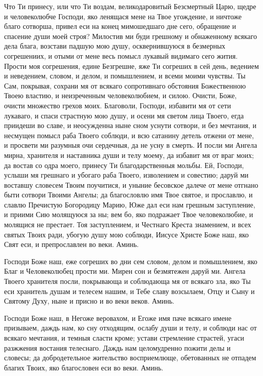 

Что Ти принесу, или что Ти воздам, великодаровитый Безсмертный Царю, щедре и человеколюбче Господи, яко ленящася мене на Твое угождение, и ничтоже благо сотворша, привел еси на конец мимошедшаго дне сего, обращение и спасение души моей строя? Милостив ми буди грешному и обнаженному всякаго дела блага, возстави падшую мою душу, осквернившуюся в безмерных согрешениих, и отыми от мене весь помысл лукавый видимаго сего жития. Прости моя согрешения, едине Безгрешне, яже Ти согреших в сей день, ведением и неведением, словом, и делом, и помышлением, и всеми моими чувствы. Ты Сам, покрывая, сохрани мя от всякаго сопротивнаго обстояния Божественною Твоею властию, и неизреченным человеколюбием, и силою. Очисти, Боже, очисти множество грехов моих. Благоволи, Господи, избавити мя от сети лукаваго, и спаси страстную мою душу, и осени мя светом лица Твоего, егда приидеши во славе, и неосужденна ныне сном уснути сотвори, и без мечтания, и несмущен помысл раба Твоего соблюди, и всю сатанину детель отжени от мене, и просвети ми разумныя очи сердечныя, да не усну в смерть. И посли ми Ангела мирна, хранителя и наставника души и телу моему, да избавит мя от враг моих; да востав со одра моего, принесу Ти благодарственныя мольбы. Ей, Господи, услыши мя грешнаго и убогаго раба Твоего, изволением и совестию; даруй ми воставшу словесем Твоим поучитися, и уныние бесовское далече от мене отгнано быти сотвори Твоими Ангелы; да благословлю имя Твое святое, и прославлю, и славлю Пречистую Богородицу Марию, Юже дал еси нам грешным заступление, и приими Сию молящуюся за ны; вем бо, яко подражает Твое человеколюбие, и молящися не престает. Тоя заступлением, и Честнаго Креста знамением, и всех святых Твоих ради, убогую душу мою соблюди, Иисусе Христе Боже наш, яко Свят еси, и препрославлен во веки. Аминь.




Господи Боже наш, еже согреших во дни сем словом, делом и помышлением, яко Благ и Человеколюбец прости ми. Мирен сон и безмятежен даруй ми. Ангела Твоего хранителя посли, покрывающа и соблюдающа мя от всякаго зла, яко Ты еси хранитель душам и телесем нашим, и Тебе славу возсылаем, Отцу и Сыну и Святому Духу, ныне и присно и во веки веков. Аминь.




Господи Боже наш, в Негоже веровахом, и Егоже имя паче всякаго имене призываем, даждь нам, ко сну отходящим, ослабу души и телу, и соблюди нас от всякаго мечтания, и темныя сласти кроме; устави стремление страстей, угаси разжжения востания телеснаго. Даждь нам целомудренно пожити делы и словесы; да добродетельное жительство восприемлюще, обетованных не отпадем благих Твоих, яко благословен еси во веки. Аминь.


